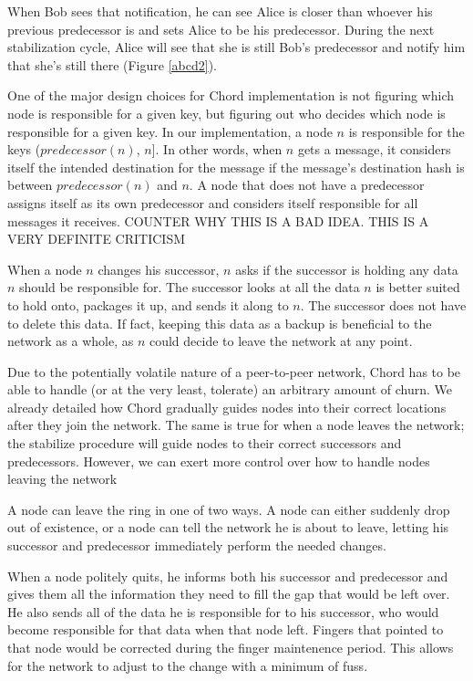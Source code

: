 \documentclass[conference, compsocconf, letterpaper]{IEEEtran}
\begin{document}
When Bob sees that notification, he can see Alice is closer than whoever his previous predecessor is and sets Alice to be his predecessor.  During the next stabilization cycle, Alice will see that she is still Bob's predecessor and notify him that she's still there (Figure \ref{abcd2}).

One of the major design choices for Chord implementation is not figuring which node is responsible for a given key, but figuring out who decides which node is responsible for a given key.  In our implementation, a node $n$ is responsible for the keys ($predecessor(n)$, $n$].  In other words, when $n$ gets a message, it considers itself the intended destination for the message if the message's destination hash is between $predecessor(n)$ and $n$.  A node that does not have a predecessor assigns itself as its own predecessor and considers itself responsible for all messages it receives.  COUNTER WHY THIS IS A BAD IDEA.  THIS IS A VERY DEFINITE CRITICISM 

When a node $n$ changes his successor, $n$ asks if the successor is holding any data $n$ should be responsible for.  The successor looks at all the data $n$ is better suited to hold onto, packages it up, and sends it along to $n$.  The successor does not have to delete this data. If fact, keeping this data as a backup is beneficial to the network as a whole, as $n$ could decide to leave the network at any point. 

Due to the potentially volatile nature of a peer-to-peer network, Chord has to be able to handle (or at the very least, tolerate) an arbitrary amount of churn.  We already detailed how Chord gradually guides nodes into their correct locations after they join the network.  The same is true for when a node leaves the network; the stabilize procedure will guide nodes to their correct successors and predecessors.  However, we can exert more control over how to handle nodes leaving the network

A node can leave the ring in one of two ways.  A node can either suddenly drop out of existence, or a node can tell the network he is about to leave, letting his successor and predecessor immediately perform the needed changes.

When a node politely quits, he informs both his successor and predecessor and gives them all the information they need to fill the gap that would be left over. He also sends all of the data he is responsible for to his successor, who would become responsible for that data when that node left.  Fingers that pointed to that node would be corrected during the finger maintenence period.  This allows for the network to adjust to the change with a minimum of fuss.
\end{document}
